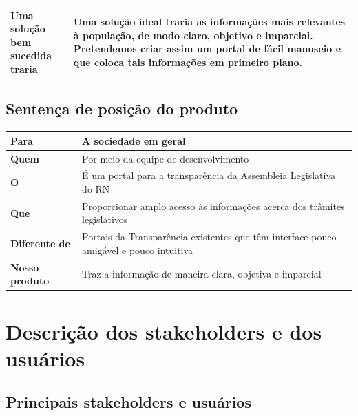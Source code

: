 \documentclass[12pt, a4paper]{article}
\begin{document}
\begin{longtabu}{X[-1] | X}
                \textbf{Uma solução \newline bem sucedida traria} &
                Uma solução ideal traria as informações mais relevantes à
                população, de modo claro, objetivo e imparcial. Pretendemos
                criar assim um portal de fácil manuseio e que coloca tais
                informações em primeiro plano.
                \\ \hline

            \end{longtabu}

        \subsection{Sentença de posição do produto}
            \begin{longtabu}{X[-1] | X}
                \hline
                \textbf{Para} &
                A sociedade em geral
                \\ \hline

                \textbf{Quem} &
                Por meio da equipe de desenvolvimento
                \\ \hline

                \textbf{O} &
                É um portal para a transparência da Assembleia Legislativa do RN
                \\ \hline

                \textbf{Que} &
                Proporcionar amplo acesso às informações acerca dos trâmites
                legislativos
                \\ \hline

                \textbf{Diferente de} &
                Portais da Transparência existentes que têm interface pouco
                amigável e pouco intuitiva
                \\ \hline

                \textbf{Nosso produto} &
                Traz a informação de maneira clara, objetiva e imparcial
                \\ \hline
            \end{longtabu}

    \section{Descrição dos stakeholders e dos usuários}
        \subsection{Principais stakeholders e usuários}
\end{document}
